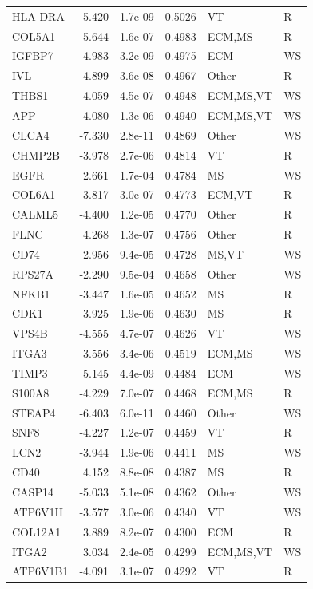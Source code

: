 \begin{table}[ht]
\begin{tabular}{lrlrll}
  HLA-DRA & 5.420 & 1.7e-09 & 0.5026 & VT & R \\ 
  COL5A1 & 5.644 & 1.6e-07 & 0.4983 & ECM,MS & R \\ 
  IGFBP7 & 4.983 & 3.2e-09 & 0.4975 & ECM & WS \\ 
  IVL & -4.899 & 3.6e-08 & 0.4967 & Other & R \\ 
  THBS1 & 4.059 & 4.5e-07 & 0.4948 & ECM,MS,VT & WS \\ 
  APP & 4.080 & 1.3e-06 & 0.4940 & ECM,MS,VT & WS \\ 
  CLCA4 & -7.330 & 2.8e-11 & 0.4869 & Other & WS \\ 
  CHMP2B & -3.978 & 2.7e-06 & 0.4814 & VT & R \\ 
  EGFR & 2.661 & 1.7e-04 & 0.4784 & MS & WS \\ 
  COL6A1 & 3.817 & 3.0e-07 & 0.4773 & ECM,VT & R \\ 
  CALML5 & -4.400 & 1.2e-05 & 0.4770 & Other & R \\ 
  FLNC & 4.268 & 1.3e-07 & 0.4756 & Other & R \\ 
  CD74 & 2.956 & 9.4e-05 & 0.4728 & MS,VT & WS \\ 
  RPS27A & -2.290 & 9.5e-04 & 0.4658 & Other & WS \\ 
  NFKB1 & -3.447 & 1.6e-05 & 0.4652 & MS & R \\ 
  CDK1 & 3.925 & 1.9e-06 & 0.4630 & MS & R \\ 
  VPS4B & -4.555 & 4.7e-07 & 0.4626 & VT & WS \\ 
  ITGA3 & 3.556 & 3.4e-06 & 0.4519 & ECM,MS & WS \\ 
  TIMP3 & 5.145 & 4.4e-09 & 0.4484 & ECM & WS \\ 
  S100A8 & -4.229 & 7.0e-07 & 0.4468 & ECM,MS & R \\ 
  STEAP4 & -6.403 & 6.0e-11 & 0.4460 & Other & WS \\ 
  SNF8 & -4.227 & 1.2e-07 & 0.4459 & VT & R \\ 
  LCN2 & -3.944 & 1.9e-06 & 0.4411 & MS & WS \\ 
  CD40 & 4.152 & 8.8e-08 & 0.4387 & MS & R \\ 
  CASP14 & -5.033 & 5.1e-08 & 0.4362 & Other & WS \\ 
  ATP6V1H & -3.577 & 3.0e-06 & 0.4340 & VT & WS \\ 
  COL12A1 & 3.889 & 8.2e-07 & 0.4300 & ECM & R \\ 
  ITGA2 & 3.034 & 2.4e-05 & 0.4299 & ECM,MS,VT & WS \\ 
  ATP6V1B1 & -4.091 & 3.1e-07 & 0.4292 & VT & R \\ 

\end{tabular}
\end{table}
